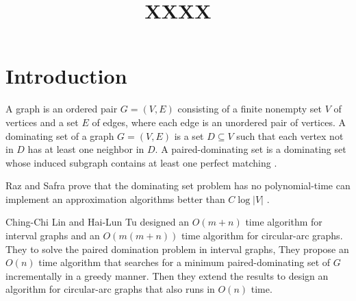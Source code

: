 \documentclass[12pt]{article}
\title{\textbf{XXXX}}
\date{}
\begin{document}
\maketitle

\section{Introduction}
A graph is an ordered pair $G=(V,E)$ consisting of a finite nonempty set $V$ of vertices and a set $E$ of edges, where each edge is an unordered pair of vertices. A dominating set of a graph $G=(V,E)$ is a set $D \subseteq V$ such that each vertex not in $D$ has at least one neighbor in $D$. A paired-dominating set is a dominating set whose induced subgraph contains at least one perfect matching \cite{lamport1}.


Raz and Safra prove that the dominating set problem has no polynomial-time can implement an approximation algorithms better than $C\log|V|$  \cite{lamport2}.

Ching-Chi Lin and Hai-Lun Tu designed an $O(m+n)$ time algorithm for interval graphs and an $O(m(m+n))$ time algorithm for circular-arc graphs. They to solve the paired domination problem in interval graphs, They propose an $O(n)$ time algorithm that searches for a minimum paired-dominating set of $G$ incrementally in a greedy manner. Then they extend the results to design an algorithm for circular-arc graphs that also runs in $O(n)$ time\cite {lamport3}.











\end{document}
